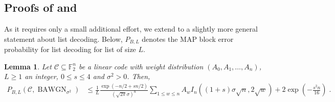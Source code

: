 \documentclass{article}
\DeclareMathOperator{\BAWGN}{BAWGN}
\theoremstyle{plain}
\theoremstyle{plain}
\theoremstyle{plain}
\theoremstyle{plain}
\theoremstyle{plain}
\theoremstyle{plain}
\theoremstyle{plain}
\newtheorem{lemma}[definition]{Lemma}%
\theoremstyle{plain}
\theoremstyle{plain}
\theoremstyle{plain}
\theoremstyle{remark}
\theoremstyle{remark}
\theoremstyle{remark}
\theoremstyle{plain}
\begin{document}
\subsection{Proofs of 
and }
\label{app:sphere_bound_proof}
As it requires only a small additional effort,
we extend 
to a slightly more general statement about list decoding.
Below, $P_{B,L}$ denotes the MAP block error
probability for list decoding for list of size $L$.

\begin{lemma}
Let $\mathcal{C}\subseteq\mathbb{F}_2^n$ be a linear code with
weight distribution
$(A_0,A_1,\ldots,A_n)$,
$L\ge 1$ an integer,
$0\le s\le 4$
and $\sigma^2>0$. Then,
\begin{align*}
P_{B,L}(\mathcal{C},\BAWGN_{\sigma^2})
&\le
\frac{1}{L}
\frac{\exp(-n/2+sn/2)}
{\left(\sqrt{2\pi}\sigma\right)^n}
\sum_{1\le w\le n}A_w
I_n\left((1+s)\sigma\sqrt{n},2\sqrt{w}\right)
+2\exp\left(-\frac{s^2n}{16}\right)\;.
\end{align*}
\end{lemma}
\end{document}
